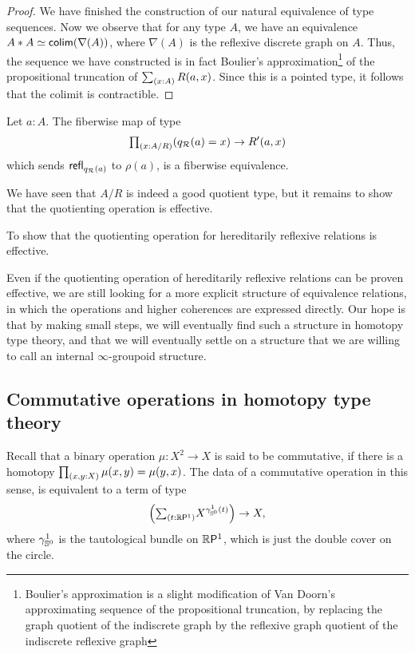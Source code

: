 \documentclass[reqno]{amsart}
\begin{document}
\begin{proof}
We have finished the construction of our natural equivalence of type sequences.
Now we observe that for any type $A$, we have an equivalence $\eqv{A\ast A}{\mathsf{colim}(\nabla(A))}$, where $\nabla(A)$ is the reflexive discrete graph on $A$. Thus, the sequence we have constructed is in fact Boulier's approximation\footnote{Boulier's approximation is a slight modification of Van Doorn's approximating sequence of the propositional truncation, by replacing the graph quotient of the indiscrete graph by the reflexive graph quotient of the indiscrete reflexive graph} of the propositional truncation of $\sm{x:A}R(a,x)$. Since this is a pointed type, it follows that the colimit is contractible.
\end{proof}

\begin{cor}
Let $a:A$. The fiberwise map of type
\begin{equation*}
\prd{x:A/R} (q_{\mathcal{R}}(a)=x)\to R'(a,x)
\end{equation*}
which sends $\mathsf{refl}_{q_{\mathcal{R}}(a)}$ to $\rho(a)$, is a fiberwise equivalence.
\end{cor}

We have seen that $A/R$ is indeed a good quotient type, but it remains to show
that the quotienting operation is effective.

\begin{proposal}\label{p:hereditarily_reflexive_relations}
To show that the quotienting operation for hereditarily reflexive relations is
effective.
\end{proposal}

Even if the quotienting operation of hereditarily reflexive relations can be
proven effective, we are still looking for a more explicit structure of 
equivalence relations, in which the operations and higher coherences are expressed
directly. Our hope is that by making small steps, we will eventually find such
a structure in homotopy type theory, and that we will eventually settle on 
a structure that we are willing to call an internal $\infty$-groupoid structure.

\subsection{Commutative operations in homotopy type theory}
Recall that a binary operation $\mu:X^2\to X$ is said to be commutative, if
there is a homotopy $\prd{x,y:X} \mu(x,y)=\mu(y,x)$. The data of a commutative
operation in this sense, is equivalent to a term of type
\begin{equation*}
\Big(\sm{t:\rprojective{1}} X^{\gamma^1_{\sphere{0}}(t)}\Big)\to X,
\end{equation*}
where $\gamma^1_{\mathbb{S}^{0}}$ is the tautological bundle on $\mathbb{R}\mathsf{P}^{1}$,
which is just the double cover on the circle.
\end{document}
